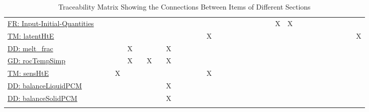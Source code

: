 \documentclass[12pt]{article}
\begin{document}
\begin{longtable}{l l l l l l l l l l l l l l l l l l l l l l l l l l l l l l l l l}
\hyperref[inputInitQuants]{FR: Input-Initial-Quantities} &  &  &  &  &  &  &  &  &  &  &  &  &  &  &  &  &  &  &  &  &  & X & X &  &  &  &  &  &  &  &  & 
\\
\hyperref[TM:latentHtE]{TM: latentHtE} &  &  &  &  &  &  &  &  &  &  &  &  & X &  &  &  &  &  &  &  &  &  &  &  &  &  &  &  &  &  &  & X
\\
\hyperref[DD:melt.frac]{DD: melt\_frac} &  &  &  & X &  &  &  & X &  &  &  &  &  &  &  &  &  &  &  &  &  &  &  &  &  &  &  &  &  &  &  & 
\\
\hyperref[GD:rocTempSimp]{GD: rocTempSimp} &  &  &  & X &  & X &  & X &  &  &  &  &  &  &  &  &  &  &  &  &  &  &  &  &  &  &  &  &  &  &  & 
\\
\hyperref[TM:sensHtE]{TM: sensHtE} &  &  & X &  &  &  &  &  &  &  &  &  & X &  &  &  &  &  &  &  &  &  &  &  &  &  &  &  &  &  &  & 
\\
\hyperref[DD:balanceLiquidPCM]{DD: balanceLiquidPCM} &  &  &  &  &  &  &  & X &  &  &  &  &  &  &  &  &  &  &  &  &  &  &  &  &  &  &  &  &  &  &  & 
\\
\hyperref[DD:balanceSolidPCM]{DD: balanceSolidPCM} &  &  &  &  &  &  &  & X &  &  &  &  &  &  &  &  &  &  &  &  &  &  &  &  &  &  &  &  &  &  &  & 
\\
\bottomrule
\caption{Traceability Matrix Showing the Connections Between Items of Different Sections}
\label{Table:Tracey}
\end{longtable}
\end{document}
